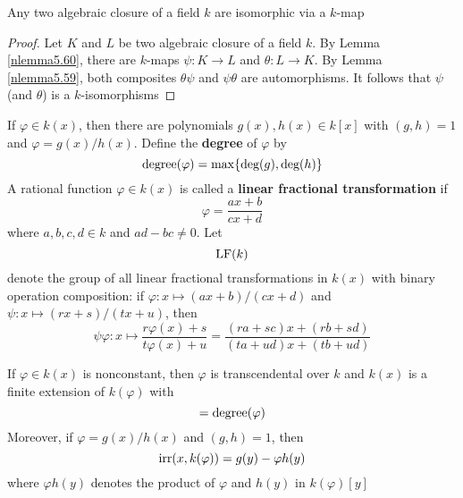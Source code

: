 \documentclass[11pt]{article}
\begin{document}
\begin{theorem}[]
Any two algebraic closure of a field \(k\) are isomorphic via a \(k\)-map
\end{theorem}

\begin{proof}
Let \(K\) and \(L\) be two algebraic closure of a field \(k\). By Lemma
\ref{nlemma5.60}, there are \(k\)-maps \(\psi:K\to L\) and \(\theta:L\to K\). By Lemma
\ref{nlemma5.59}, both composites \(\theta\psi\) and \(\psi\theta\) are
automorphisms. It follows that \(\psi\) (and \(\theta\)) is a \(k\)-isomorphisms
\end{proof}

\begin{definition}[]
If \(\varphi\in k(x)\), then there are polynomials \(g(x),h(x)\in k[x]\) with
\((g,h)=1\) and \(\varphi=g(x)/h(x)\). Define the \textbf{degree} of \(\varphi\) by
\begin{equation*}
\text{degree}(\varphi)=\max\{\text{deg}(g),\text{deg}(h)\}
\end{equation*}
A rational function \(\varphi\in k(x)\) is called a \textbf{linear fractional
transformation} if
\begin{equation*}
\varphi=\frac{ax+b}{cx+d}
\end{equation*}
where \(a,b,c,d\in k\) and \(ad-bc\neq 0\). Let
\begin{equation*}
\operatorname{LF}(k)
\end{equation*}
denote the group of all linear fractional transformations in \(k(x)\) with
binary operation composition: if \(\varphi:x\mapsto(ax+b)/(cx+d)\) and 
\(\psi:x\mapsto(rx+s)/(tx+u)\), then 
\begin{equation*}
\psi\varphi:x\mapsto\frac{r\varphi(x)+s}{t\varphi(x)+u}=
\frac{(ra+sc)x+(rb+sd)}{(ta+ud)x+(tb+ud)}
\end{equation*}
\end{definition}

\begin{proposition}[]
\label{nprop5.62}
If \(\varphi\in k(x)\) is nonconstant, then \(\varphi\) is transcendental over \(k\) and
\(k(x)\) is a finite extension of \(k(\varphi)\) with
\begin{equation*}
[k(x):k(\varphi)]=\degree(\varphi)
\end{equation*}
Moreover, if \(\varphi=g(x)/h(x)\) and \((g,h)=1\), then 
\begin{equation*}
\operatorname{irr}(x,k(\varphi))=g(y)-\varphi h(y)
\end{equation*}
where \(\varphi h(y)\) denotes the product of \(\varphi\) and \(h(y)\) in \(k(\varphi)[y]\)
\end{proposition}
\end{document}
